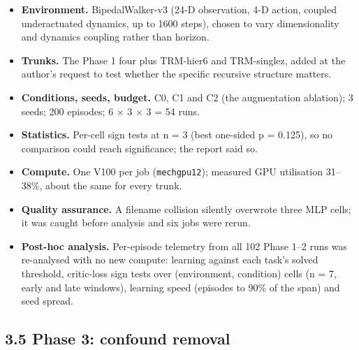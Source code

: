 \documentclass[11pt]{article}
\begin{document}
\begin{itemize}
\item \textbf{Environment.} BipedalWalker-v3 (24-D observation, 4-D action, coupled underactuated dynamics, up to 1600 steps), chosen to vary dimensionality and dynamics coupling rather than horizon.
\item \textbf{Trunks.} The Phase 1 four plus TRM-hier6 and TRM-singlez, added at the author's request to test whether the specific recursive structure matters.
\item \textbf{Conditions, seeds, budget.} C0, C1 and C2 (the augmentation ablation); 3 seeds; 200 episodes; 6 $\times$ 3 $\times$ 3 = 54 runs.
\item \textbf{Statistics.} Per-cell sign tests at n = 3 (best one-sided p = 0.125), so no comparison could reach significance; the report said so.
\item \textbf{Compute.} One V100 per job (\texttt{mechgpu12}); measured GPU utilisation 31--38\%, about the same for every trunk.
\item \textbf{Quality assurance.} A filename collision silently overwrote three MLP cells; it was caught before analysis and six jobs were rerun.
\item \textbf{Post-hoc analysis.} Per-episode telemetry from all 102 Phase 1--2 runs was re-analysed with no new compute: learning against each task's solved threshold, critic-loss sign tests over (environment, condition) cells (n = 7, early and late windows), learning speed (episodes to 90\% of the span) and seed spread.
\end{itemize}



\subsection*{3.5 Phase 3: confound removal}
\end{document}
